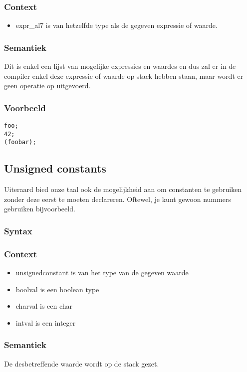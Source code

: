 \documentclass[]{article}
\begin{document}
\subsubsection{Context}
\begin{itemize}
\item expr\_al7 is van hetzelfde type als de gegeven expressie of waarde.
\end{itemize}
\subsubsection{Semantiek}
Dit is enkel een lijst van mogelijke expressies en waardes en dus zal er in de compiler enkel deze expressie of waarde op stack hebben staan, maar wordt er geen operatie op uitgevoerd.
\subsubsection{Voorbeeld}
\begin{lstlisting}[style=SELMA]
foo;
42;
(foobar);
\end{lstlisting}

\subsection{Unsigned constants}
Uiteraard bied onze taal ook de mogelijkheid aan om constanten te gebruiken zonder deze eerst te moeten declareren. Oftewel, je kunt gewoon nummers gebruiken bijvoorbeeld.
\subsubsection{Syntax}

\subsubsection{Context}
\begin{itemize}
\item unsignedconstant is van het type van de gegeven waarde
\item boolval is een boolean type
\item charval is een char
\item intval is een integer
\end{itemize}
\subsubsection{Semantiek}
De desbetreffende waarde wordt op de stack gezet.
\end{document}

